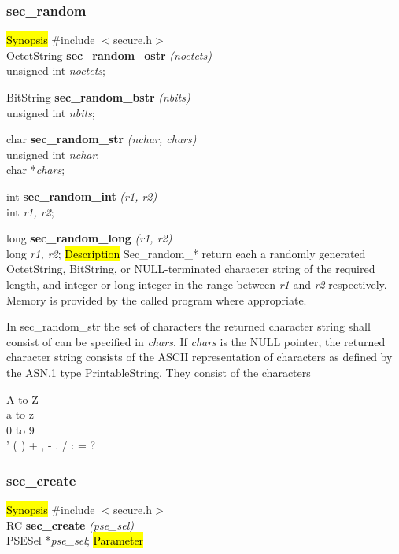 \subsubsection{sec\_random}
\label{random}
\hl{Synopsis}
\#include $<$secure.h$>$ \\ [0.5cm]
OctetString {\bf *sec\_random\_ostr} {\em (noctets)} \\
unsigned int {\em noctets}; 

BitString {\bf *sec\_random\_bstr} {\em (nbits)} \\
unsigned int {\em nbits}; 

char {\bf *sec\_random\_str} {\em (nchar, chars)} \\
unsigned int {\em nchar}; \\
char *{\em chars}; 

int {\bf sec\_random\_int} {\em (r1, r2)} \\
int {\em r1, r2}; 

long {\bf sec\_random\_long} {\em (r1, r2)} \\
long {\em r1, r2};
\hl{Description}
Sec\_random\_* return each a randomly generated OctetString, BitString, or NULL-terminated
character string of the required length, and integer or long integer in the range between
{\em r1} and {\em r2} respectively. Memory is provided by the called program
where appropriate. 

In sec\_random\_str the set of characters the returned character string shall consist of can
be specified in {\em chars}. If {\em chars} is the NULL pointer, the returned character string
consists of the ASCII representation of characters as defined by the ASN.1 type
PrintableString.
They consist of the characters
\begin{center}
{\small
A to Z \\
a to z \\
0 to 9 \\
' ( ) + , - . / : = ?  
}
\end {center}

\subsubsection{sec\_create}
\label{sec_create}
\hl{Synopsis}
\#include $<$secure.h$>$ \\ [0.5cm]
RC {\bf sec\_create} {\em (pse\_sel)} \\
PSESel *{\em pse\_sel};
\hl{Parameter}

